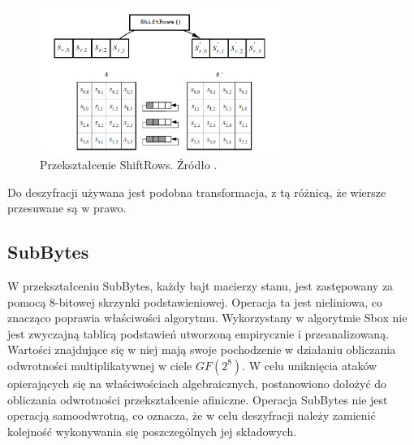 \begin{figure}[H]
    \centering
    \includegraphics[width=0.7\textwidth]{rysunki/AES_opis/shiftrows.PNG}
    \caption{Przekształcenie ShiftRows. Źródło \cite{fips_197}.}
    \label{fig:shiftrows}
\end{figure}

Do deszyfracji używana jest podobna transformacja, z tą różnicą, że wiersze przesuwane są w prawo.

\subsection{SubBytes}

W przekształceniu SubBytes, każdy bajt macierzy stanu, jest zastępowany za pomocą 8-bitowej skrzynki podstawieniowej. Operacja ta jest nieliniowa, co znacząco poprawia właściwości algorytmu. Wykorzystany w algorytmie Sbox nie jest zwyczajną tablicą podstawień utworzoną empirycznie i przeanalizowaną. Wartości znajdujące się w niej mają swoje pochodzenie w działaniu obliczania odwrotności multiplikatywnej w ciele $GF(2^8)$. W celu uniknięcia ataków opierających się na właściwościach algebraicznych, postanowiono dołożyć do obliczania odwrotności przekształcenie afiniczne. Operacja SubBytes nie jest operacją samoodwrotną, co oznacza, że w celu deszyfracji należy zamienić kolejność wykonywania się poszczególnych jej składowych.

